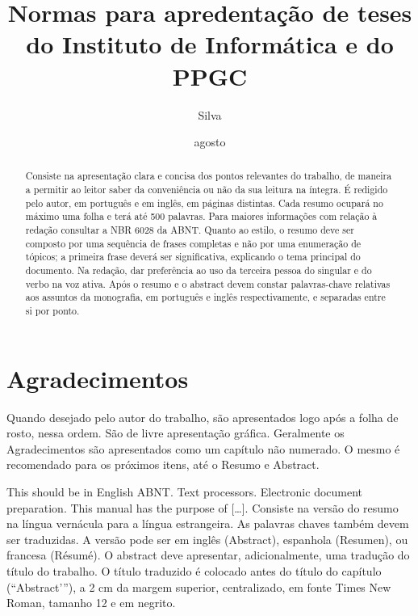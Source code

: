 \documentclass[ppgc,diss]{iiufrgs}
\title{
    Normas para apredentação de teses do Instituto de Informática e do PPGC
}
\author{Silva}{João da}
\date{agosto}{2014}
\begin{document}
\maketitle


\chapter*{Agradecimentos}
Quando desejado pelo autor do trabalho, são apresentados logo após a folha de
rosto, nessa ordem.
São de livre apresentação gráfica.
Geralmente os Agradecimentos são apresentados como um capítulo não numerado.
O mesmo é recomendado para os próximos itens, até o Resumo e Abstract.


\begin{abstract}
    Consiste na apresentação clara e concisa dos pontos relevantes do trabalho,
    de maneira a permitir ao leitor saber da conveniência ou não da sua leitura na íntegra.
    É redigido pelo autor, em português e em inglês, em páginas distintas.
    Cada resumo ocupará no máximo uma folha e terá até 500 palavras.
    Para maiores informações com relação à redação consultar a NBR 6028 da ABNT.
    Quanto ao estilo, o resumo deve ser composto por uma sequência de frases
    completas e não por uma enumeração de tópicos; a primeira frase deverá ser
    significativa, explicando o tema principal do documento.
    Na redação, dar preferência ao uso da terceira pessoa do singular e do verbo na voz ativa.
    Após o resumo e o abstract devem constar palavras-chave relativas aos assuntos
    da monografia, em português e inglês respectivamente, e separadas entre si por ponto.
\end{abstract}

\begin{englishabstract}
    {This should be in English}
    {ABNT. Text processors. Electronic document preparation.}
    This manual has the purpose of [\ldots].
    Consiste na versão do resumo na língua vernácula para a língua estrangeira.
    As palavras chaves também devem ser traduzidas.
    A versão pode ser em inglês (Abstract), espanhola (Resumen), ou francesa (Résumé).
    O abstract deve apresentar, adicionalmente, uma tradução do título do trabalho.
    O título traduzido é colocado antes do título do capítulo (“Abstract’”), a
    2 cm da margem superior, centralizado, em fonte Times New Roman, tamanho 12 e em negrito.
\end{englishabstract}
\end{document}
